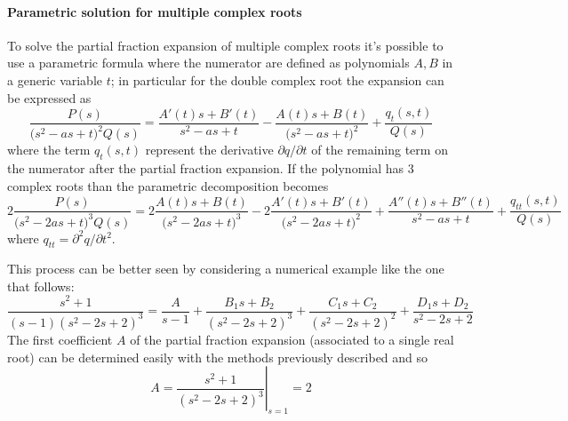 	\paragraph{Parametric solution for multiple complex roots} To solve the partial fraction expansion of multiple complex roots it's possible to use a parametric formula where the numerator are defined as polynomials $A,B$ in a generic variable $t$; in particular for the double complex root the expansion can be expressed as
	\begin{equation}
		\frac{P(s)}{\big(s^2-as +t\big)^2 Q(s)} = \frac{A'(t)s + B'(t)}{s^2-as+t} - \frac{A(t)s + B(t)}{\big(s^2-as+t\big)^2} + \frac{q_t(s,t)}{Q(s)} 
	\end{equation}
	where the term $q_t(s,t)$ represent the derivative $\partial q/\partial t$ of the remaining term on the numerator after the partial fraction expansion. If the polynomial has 3 complex roots than the parametric decomposition becomes
	\begin{equation} \label{eq:laplace:3mulrcomplroots}
		2\frac{P(s)}{\big(s^2-2as +t\big)^3 Q(s)} = 2\frac{A(t)s + B(t)}{\big(s^2-2as+t\big)^3} - 2\frac{A'(t)s + B'(t)}{\big(s^2-2as+t\big)^2} +  \frac{A''(t)s + B''(t)}{s^2-as+t} + \frac{q_{tt}(s,t)}{Q(s)} 
	\end{equation}
	where $q_{tt}=\partial^2q/\partial t^2$.  \vspace{3mm}
	
	This process can be better seen by considering a numerical example like the one that follows:
	\[ \frac{s^2+1}{(s-1)(s^2-2s+2)^3} = \frac{A}{s-1} + \frac{B_1s + B_2}{(s^2-2s+2)^3} + \frac {C_1s + C_2}{(s^2-2s+2)^2} + \frac{D_1s+D_2}{s^2-2s+2}\]
	The first coefficient $A$ of the partial fraction expansion (associated to a single real root) can be determined easily with the methods previously described and so
	\[ A= \left. \frac{s^2+1}{(s^2-2s+2)^3} \right|_{s=1} = 2	\]
	
